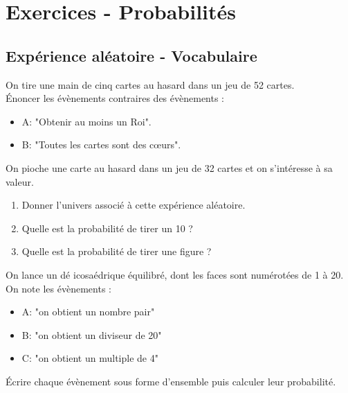 \vspace{6cm}

\ligne

\ligne

\ligne

\ligne

\ligne

\ligne

\bigskip

\newpage

\section*{Exercices - Probabilités}
{\setlength{\columnseprule}{0pt}
\setcounter{NumEx}{1}

\subsection*{Expérience aléatoire - Vocabulaire}

\begin{Exercice}
On tire une main de cinq cartes au hasard dans un jeu de 52 cartes.\\
Énoncer les évènements contraires des évènements :
\begin{itemize}[label=\textcolor{Couleur6}{$\bullet$}]
\item A:  "Obtenir au moins un Roi".
\item B:  "Toutes les cartes sont des cœurs".
\end{itemize}
\end{Exercice}

\begin{Exercice}
On pioche une carte au hasard dans un jeu de 32 cartes et on s'intéresse à sa valeur.
\begin{enumerate}
\item Donner l'univers associé à cette expérience aléatoire.
\item Quelle est la probabilité de tirer un 10 ?
\item Quelle est la probabilité de tirer une figure ?
\end{enumerate}
\end{Exercice}

\begin{Exercice}
On lance un dé icosaédrique équilibré, dont les faces sont numérotées de 1 à 20.
On note les évènements :
\begin{itemize}[label=\textcolor{Couleur6}{$\bullet$}]
\item A:  "on obtient un nombre pair"
\item B:  "on obtient un diviseur de 20"
\item C:  "on obtient un multiple de 4"
\end{itemize}
Écrire chaque évènement sous forme d'ensemble puis calculer leur probabilité.
\end{Exercice}

}
